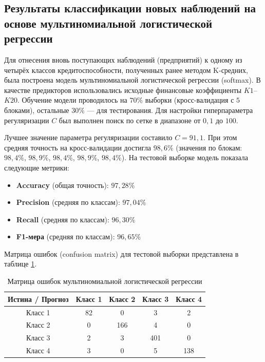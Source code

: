 \documentclass[14pt,a4paper]{extarticle}
\begin{document}
\subsection{Результаты классификации новых наблюдений на основе мультиномиальной логистической регрессии}

Для отнесения вновь поступающих наблюдений (предприятий) к одному из четырёх классов 
кредитоспособности, полученных ранее методом K-средних, была построена модель мультиномиальной 
логистической регрессии (softmax). В качестве предикторов использовались исходные финансовые 
коэффициенты \(K1\)–\(K20\). Обучение модели проводилось на \(70\%\) выборки (кросс-валидация с 
\(5\) блоками), остальные \(30\%\) — для тестирования. Для настройки гиперпараметра регуляризации 
\(C\) был выполнен поиск по сетке в диапазоне от \(0,1\) до \(100\).

Лучшее значение параметра регуляризации составило \(C = 91{,}1\). При этом средняя 
точность на кросс-валидации достигла \(98{,}6\%\) (значения по блокам: \(98,4\%\), 
\(98,9\%\), \(98,4\%\), \(98,9\%\), \(98,4\%\)). На тестовой выборке модель показала следующие метрики:

\begin{itemize}
    \item \textbf{Accuracy} (общая точность): \(97{,}28\%\)
    \item \textbf{Precision} (средняя по классам): \(97{,}04\%\)
    \item \textbf{Recall} (средняя по классам): \(96{,}30\%\)
    \item \textbf{F1-мера} (средняя по классам): \(96{,}65\%\)
\end{itemize}

Матрица ошибок (confusion matrix) для тестовой выборки представлена в таблице \ref{tab:conf_matrix}.

\begin{table}[H]
    \centering
    \caption{Матрица ошибок мультиномиальной логистической регрессии}
    \label{tab:conf_matrix}
    \begin{tabular}{c|cccc}
        \toprule
        Истина / Прогноз & Класс 1 & Класс 2 & Класс 3 & Класс 4 \\
        \midrule
        Класс 1 & 82 & 0 & 3 & 2 \\
        Класс 2 & 0  & 166 & 4 & 0 \\
        Класс 3 & 2  & 3   & 401 & 0 \\
        Класс 4 & 3  & 0   & 5   & 138 \\
        \bottomrule
    \end{tabular}
\end{table}
\end{document}
